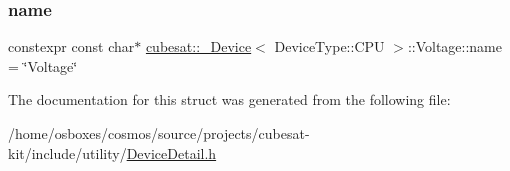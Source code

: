 \subsubsection{\texorpdfstring{name}{name}}
{\footnotesize\ttfamily constexpr const char$\ast$ \hyperlink{structcubesat_1_1__Device}{cubesat\+::\+\_\+\+Device}$<$ Device\+Type\+::\+C\+PU $>$\+::Voltage\+::name = \char`\"{}Voltage\char`\"{}\hspace{0.3cm}{\ttfamily [static]}}



The documentation for this struct was generated from the following file\+:\begin{DoxyCompactItemize}
\item 
/home/osboxes/cosmos/source/projects/cubesat-\/kit/include/utility/\hyperlink{DeviceDetail_8h}{Device\+Detail.\+h}\end{DoxyCompactItemize}
